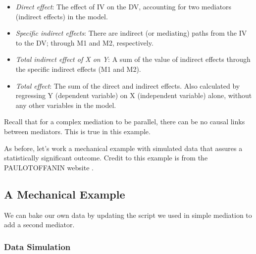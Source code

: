 \documentclass[
  english,
]{book}
\providecommand{\tightlist}{%
  \setlength{\itemsep}{0pt}\setlength{\parskip}{0pt}}
\begin{document}
\begin{itemize}
\tightlist
\item
  \emph{Direct effect}: The effect of IV on the DV, accounting for two mediators (indirect effects) in the model.
\item
  \emph{Specific indirect effects}: There are indirect (or mediating) paths from the IV to the DV; through M1 and M2, respectively.
\item
  \emph{Total indirect effect of X on Y}: A sum of the value of indirect effects through the specific indirect effects (M1 and M2).
\item
  \emph{Total effect}: The sum of the direct and indirect effects. Also calculated by regressing Y (dependent variable) on X (independent variable) alone, without any other variables in the model.
\end{itemize}

Recall that for a complex mediation to be parallel, there can be no causal links between mediators. This is true in this example.

As before, let's work a mechanical example with simulated data that assures a statistically significant outcome. Credit to this example is from the PAULOTOFFANIN website \citep{toffanin_multiple-mediator_2017}.

\hypertarget{a-mechanical-example}{%
\subsection{A Mechanical Example}\label{a-mechanical-example}}

We can bake our own data by updating the script we used in simple mediation to add a second mediator.

\hypertarget{data-simulation}{%
\subsubsection{Data Simulation}\label{data-simulation}}
\end{document}

